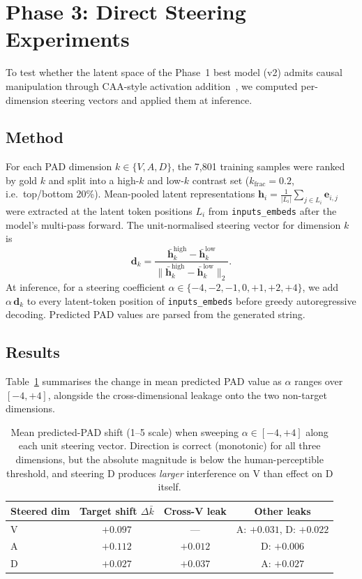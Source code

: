 \documentclass[12pt,twoside]{report}
\begin{document}
\section{Phase 3: Direct Steering Experiments}

To test whether the latent space of the Phase~1 best model (v2) admits causal manipulation through CAA-style activation addition~\cite{caa}, we computed per-dimension steering vectors and applied them at inference.

\subsection{Method}

For each PAD dimension $k \in \{V, A, D\}$, the 7{,}801 training samples were ranked by gold $k$ and split into a high-$k$ and low-$k$ contrast set ($k_{\text{frac}} = 0.2$, i.e.\ top/bottom 20\%).
Mean-pooled latent representations $\mathbf{h}_i = \frac{1}{|L_i|}\sum_{j \in L_i} \mathbf{e}_{i,j}$ were extracted at the latent token positions $L_i$ from \texttt{inputs\_embeds} after the model's multi-pass forward.
The unit-normalised steering vector for dimension $k$ is
\[
    \mathbf{d}_k = \frac{\bar{\mathbf{h}}^{\text{high}}_k - \bar{\mathbf{h}}^{\text{low}}_k}{\|\bar{\mathbf{h}}^{\text{high}}_k - \bar{\mathbf{h}}^{\text{low}}_k\|_2}.
\]
At inference, for a steering coefficient $\alpha \in \{-4, -2, -1, 0, +1, +2, +4\}$, we add $\alpha\,\mathbf{d}_k$ to every latent-token position of \texttt{inputs\_embeds} before greedy autoregressive decoding.
Predicted PAD values are parsed from the generated string.

\subsection{Results}

Table~\ref{tab:steering_summary} summarises the change in mean predicted PAD value as $\alpha$ ranges over $[-4, +4]$, alongside the cross-dimensional leakage onto the two non-target dimensions.

\begin{table}[H]
\centering
\begin{tabular}{lccc}
\toprule
\textbf{Steered dim} & \textbf{Target shift $\Delta\bar{k}$} & \textbf{Cross-V leak} & \textbf{Other leaks} \\
\midrule
V & $+0.097$ & --- & A: $+0.031$, D: $+0.022$ \\
A & $+0.112$ & $+0.012$ & D: $+0.006$ \\
D & $+0.027$ & $+0.037$ & A: $+0.027$ \\
\bottomrule
\end{tabular}
\caption{Mean predicted-PAD shift (1--5 scale) when sweeping $\alpha \in [-4, +4]$ along each unit steering vector. Direction is correct (monotonic) for all three dimensions, but the absolute magnitude is below the human-perceptible threshold, and steering D produces \emph{larger} interference on V than effect on D itself.}
\label{tab:steering_summary}
\end{table}
\end{document}
